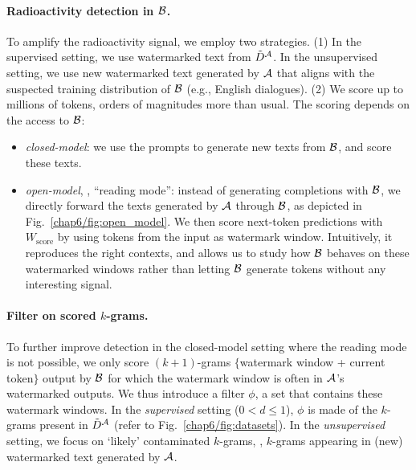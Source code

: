 \paragraph{Radioactivity detection in $\mathcal B$.}
To amplify the radioactivity signal, we employ two strategies.
(1) In the supervised setting, we use watermarked text from $\Tilde{D}^\mathcal A$. In the unsupervised setting, we use new watermarked text generated by $\mathcal A$ that aligns with the suspected training distribution of $\mathcal B$ (e.g., English dialogues).
(2) We score up to millions of tokens, orders of magnitudes more than usual.
The scoring depends on the access to $\mathcal B$:
\begin{itemize}[leftmargin=*, itemsep=0pt, topsep=0pt]
    \item \emph{closed-model}: we use the prompts to generate new texts from $\mathcal B$, and score these texts.
    \item \emph{open-model}, \aka, ``reading mode'': instead of generating completions with $\mathcal B$, we directly forward the texts generated by $\mathcal A$ through $\mathcal B$, as depicted in Fig.~\ref{chap6/fig:open_model}.
    We then score next-token predictions with $W_{\textrm{score}}$ by using tokens from the input as watermark window.
    Intuitively, it reproduces the right contexts, and allows us to study how $\mathcal B$ behaves on these watermarked windows rather than letting $\mathcal B$ generate tokens without any interesting signal.
\end{itemize}


\paragraph{Filter on scored $k$-grams.}
To further improve detection in the closed-model setting where the reading mode is not possible, we only score $(k+1)$-grams $\{$watermark window + current token$\}$ output by $\mathcal B$ for which the watermark window is often in $\mathcal A$’s watermarked outputs.
We thus introduce a filter $\phi$, a set that contains these watermark windows.
In the \emph{supervised} setting ($0<d\leq1$), $\phi$ is made of the $k$-grams present in $\Tilde{D}^\mathcal{A}$ (refer to Fig.~\ref{chap6/fig:datasets}).
In the \emph{unsupervised} setting, we focus on `likely' contaminated $k$-grams, \eg, $k$-grams appearing in (new) watermarked text generated by $\mathcal A$.

